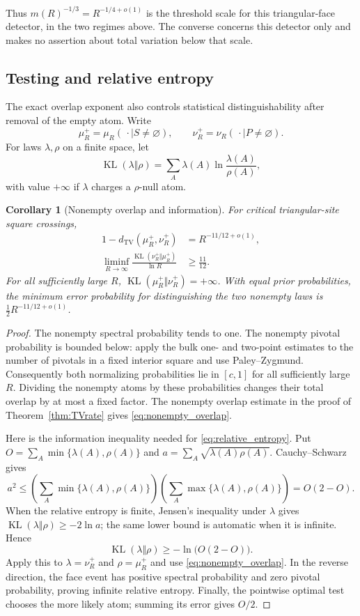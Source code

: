 \documentclass[11pt]{amsart}
\newtheorem{corollary}[theorem]{Corollary}
\theoremstyle{remark}
\newcommand{\TV}{d_{\mathrm{TV}}}
\begin{document}
Thus $m(R)^{-1/3}=R^{-1/4+o(1)}$ is the threshold scale for this triangular-face detector, in the two regimes above. The converse concerns this detector only and makes no assertion about total variation below that scale.

\subsection{Testing and relative entropy}\label{sec:testing}

The exact overlap exponent also controls statistical distinguishability after removal of the empty atom. Write
\[
 \mu_R^+=\mu_R(\,\cdot\mid S\ne\varnothing),\qquad
 \nu_R^+=\nu_R(\,\cdot\mid P\ne\varnothing).
\]
For laws $\lambda,\rho$ on a finite space, let
\[
 \operatorname{KL}(\lambda\Vert\rho)
 =\sum_A\lambda(A)\ln\frac{\lambda(A)}{\rho(A)},
\]
with value $+\infty$ if $\lambda$ charges a $\rho$-null atom.

\begin{corollary}[Nonempty overlap and information]\label{cor:testing}
For critical triangular-site square crossings,
\begin{align}
 1-\TV(\mu_R^+,\nu_R^+)&=R^{-11/12+o(1)},\label{eq:nonempty_overlap}\\
 \liminf_{R\to\infty}\frac{\operatorname{KL}(\nu_R^+\Vert\mu_R^+)}{\ln R}
 &\ge\frac{11}{12}.\label{eq:relative_entropy}
\end{align}
For all sufficiently large $R$, $\operatorname{KL}(\mu_R^+\Vert\nu_R^+)=+\infty$. With equal prior probabilities, the minimum error probability for distinguishing the two nonempty laws is $\frac12R^{-11/12+o(1)}$.
\end{corollary}
\begin{proof}
The nonempty spectral probability tends to one. The nonempty pivotal probability is bounded below: apply the bulk one- and two-point estimates to the number of pivotals in a fixed interior square and use Paley--Zygmund. Consequently both normalizing probabilities lie in $[c,1]$ for all sufficiently large $R$. Dividing the nonempty atoms by these probabilities changes their total overlap by at most a fixed factor. The nonempty overlap estimate in the proof of Theorem~\ref{thm:TVrate} gives \eqref{eq:nonempty_overlap}.

Here is the information inequality needed for \eqref{eq:relative_entropy}. Put $O=\sum_A\min\{\lambda(A),\rho(A)\}$ and $a=\sum_A\sqrt{\lambda(A)\rho(A)}$. Cauchy--Schwarz gives
\[
 a^2\le\left(\sum_A\min\{\lambda(A),\rho(A)\}\right)
 \left(\sum_A\max\{\lambda(A),\rho(A)\}\right)=O(2-O).
\]
When the relative entropy is finite, Jensen's inequality under $\lambda$ gives $\operatorname{KL}(\lambda\Vert\rho)\ge-2\ln a$; the same lower bound is automatic when it is infinite. Hence
\[
 \operatorname{KL}(\lambda\Vert\rho)\ge-\ln\bigl(O(2-O)\bigr).
\]
Apply this to $\lambda=\nu_R^+$ and $\rho=\mu_R^+$ and use \eqref{eq:nonempty_overlap}. In the reverse direction, the face event has positive spectral probability and zero pivotal probability, proving infinite relative entropy. Finally, the pointwise optimal test chooses the more likely atom; summing its error gives $O/2$.
\end{proof}
\end{document}
